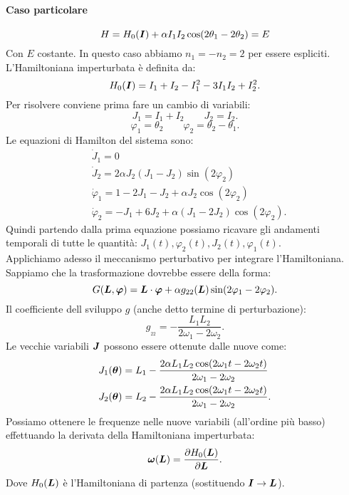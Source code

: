\paragraph{Caso particolare}%
\label{par:Caso particolare_17}
\begin{equation}
    H = H_0(\boldsymbol{I})+ \alpha I_1I_2\cos (2\theta_1-2\theta_2) = E
    \label{eq:Caso particolare_17}
\end{equation}
Con $E$ costante. In questo caso abbiamo $n_1 = -n_2 = 2$ per essere espliciti.
L'Hamiltoniana imperturbata è definita da:
\[
    H_0(\boldsymbol{I}) = I_1 + I_2 - I_1^2 - 3I_1I_2 + I_2^2
.\] 
Per risolvere conviene prima fare un cambio di variabili: 
\[
    J_1=I_1+I_2 \qquad J_2 = I_2
.\] 
\[
    \varphi_1 = \theta_2 \qquad \varphi_2 = \theta_2-\theta_1
.\] 
Le equazioni di Hamilton del sistema sono:
\[\begin{aligned}
    & \dot{J}_1 = 0\\
    & \dot{J}_2 = 2\alpha J_2(J_1-J_2)\sin (2\varphi_2)\\
    & \dot{\varphi}_1 = 1-2J_1-J_2+\alpha J_2\cos (2\varphi_2)\\
    & \dot{\varphi }_2=-J_1+6J_2+\alpha (J_1-2J_2)\cos (2\varphi_2)
.\end{aligned}\]
Quindi partendo dalla prima equazione possiamo ricavare gli andamenti temporali di tutte le quantità: $J_1(t),\varphi_2(t), J_2(t), \varphi_1(t)$.\\
Applichiamo adesso il meccanismo perturbativo per integrare l'Hamiltoniana. Sappiamo che la trasformazione dovrebbe essere della forma:
\[
    G(\boldsymbol{L}, \boldsymbol{\varphi}) = \boldsymbol{L}\cdot \boldsymbol{\varphi}  + \alpha g_{22}(\boldsymbol{ L})\sin (2\varphi_1-2\varphi_2)
.\] 
Il coefficiente dell sviluppo $g$ (anche detto termine di perturbazione):
\[
    g_{_{22}} = - \frac{L_1L_2}{2\omega_1-2\omega_2}
.\] 
Le vecchie variabili $\boldsymbol{J}$ possono essere ottenute dalle nuove come:
\[\begin{aligned}
    & J_1(\boldsymbol{\theta}) = L_1 - \frac{2\alpha L_1L_2 \cos (2\omega_1 t-2\omega_2 t)}{2\omega_1-2\omega_2}\\
    & J_2(\boldsymbol{\theta}) = L_2 - \frac{2\alpha L_1L_2 \cos (2\omega_1 t-2\omega_2 t)}{2\omega_1-2\omega_2}
.\end{aligned}\]
Possiamo ottenere le frequenze nelle nuove variabili (all'ordine più basso) effettuando la derivata della Hamiltoniana imperturbata:
\[
    \boldsymbol{\omega} (\boldsymbol{L})= \frac{\partial H_0(\boldsymbol{L})}{\partial \boldsymbol{L}} 
.\] 
Dove $H_0(\boldsymbol{L})$ è l'Hamiltoniana di partenza (sostituendo $\boldsymbol{I}\to \boldsymbol{L}$).
